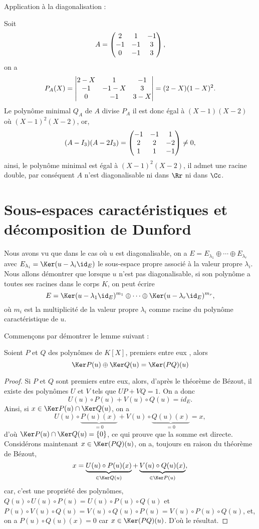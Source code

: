 \documentclass[class=report,crop=false]{standalone}
\begin{document}
Application à la diagonalisation :
\begin{exemple}
Soit $$A=\left(\begin{matrix}2&1&-1\cr -1&-1&3\cr 0&-1&3\end{matrix}\right),$$
on a $$P_A(X)=\left|\begin{matrix}2-X&1&-1\cr -1&-1-X&3\cr 0&-1&3-X\end{matrix}\right|=(2-X)(1-X)^2.$$
Le polynôme minimal $Q_A$ de $A$ divise $P_A$ il est donc égal à $(X-1)(X-2)$ où $(X-1)^2(X-2)$, or,
$$(A-I_3)(A-2I_3)=\left(\begin{matrix}-1&-1&1\cr 2&2&-2\cr 1&1&-1\end{matrix}\right)\neq 0,$$
ainsi, le polynôme minimal est égal à $(X-1)^2(X-2)$, 
il admet une racine double, par conséquent $A$ n'est diagonalisable 
ni dans $\Rr$ ni dans $\Cc$.  
\end{exemple}



\section{Sous-espaces caractéristiques et décomposition de Dunford}

Nous avons vu que dans le cas où $u$ est diagonalisable, 
on a $E=E_{\lambda_1}\oplus\cdots\oplus E_{\lambda_r}$ avec 
$E_{\lambda_i}=\Ker(u-\lambda_i\id_E)$ le sous-espace propre associé 
à la valeur propre $\lambda_i$. Nous allons démontrer que lorsque $u$ 
n'est pas diagonalisable, si son polynôme a toutes ses racines dans 
le corps $K$, on peut écrire
$$E=\Ker(u-\lambda_1\id_E)^{m_1}\oplus\cdots\oplus\Ker(u-\lambda_r\id_E)^{m_r},$$
où $m_i$ est la multiplicité de la valeur propre $\lambda_i$ comme 
racine du polynôme caractéristique de $u$.

Commençons par démontrer le lemme suivant :

\begin{lemme}
Soient $P$ et $Q$ des polynômes de $K[X]$, premiers entre eux , alors
$$\Ker P(u)\oplus\Ker Q(u)=\Ker(PQ)(u)$$  
\end{lemme}
 

\begin{proof}
Si $P$ et $Q$ sont premiers entre eux, alors, d'après le théorème de Bézout, il existe des polynômes $U$ et $V$ tels que $UP+VQ=1$. On a donc 
$$U(u)\circ P(u)+V(u)\circ Q(u)=id_E.$$
Ainsi, si $x\in\Ker P(u)\cap\Ker Q(u)$, on a
$$U(u)\circ \underbrace{P(u)(x)}_{=0}+V(u)\circ\underbrace{Q(u)(x)}_{=0}=x,$$
d'où $\Ker P(u)\cap\Ker Q(u)=\{0\}$, ce qui prouve que la somme est directe. Considérons maintenant $x\in\Ker(PQ)(u)$, on a, toujours en raison du théorème de Bézout, 
$$x=\underbrace{U(u)\circ P(u)(x)}_{\in\Ker Q(u)}+\underbrace{V(u)\circ Q(u)(x)}_{\in\Ker P(u)},$$
car, c'est une propriété des polynômes, $Q(u)\circ U(u)\circ P(u)=U(u)\circ P(u)\circ Q(u)$ et $P(u)\circ V(u)\circ Q(u)=V(u)\circ Q(u)\circ P(u)=V(u)\circ P(u)\circ Q(u)$, 
et, on a $P(u)\circ Q(u)(x)=0$ car $x\in\Ker(PQ)(u)$. D'où le résultat.
\end{proof}
\end{document}
